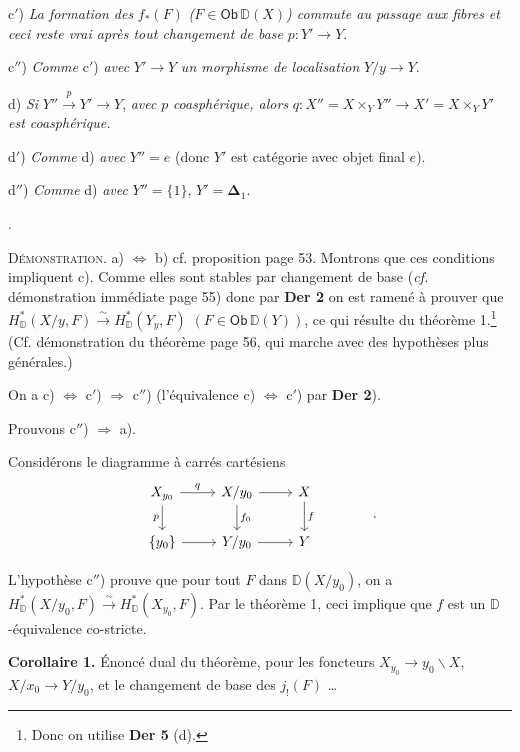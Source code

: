 \documentclass[11pt]{article}
\newcommand{\printedpage}[1]{\marginpar{\footnotesize p.~#1}}
\newcommand{\msp}[1]{\marginpar{\footnotesize [#1]}}
\newcommand{\D}{\mathbb{D}}
\newcommand{\Ob}{\mathsf{Ob}}
\begin{document}
c$'$) \textit{La formation des} $f_*(F)$ \textit{(}$F \in \Ob\, \D(X)$\textit{) commute au passage aux fibres et ceci reste vrai après tout changement de base} $p : Y' \to Y$.

c$''$) \textit{Comme} c$'$) \textit{avec} $Y' \to Y$ \textit{un morphisme de localisation} $Y/y \to Y$.

d) \textit{Si} $Y'' \overset{p}{\to} Y' \to Y$, \textit{avec} $p$ \textit{coasphérique, alors} $q : X'' = X \times_Y Y'' \to X' = X \times_Y Y'$ \textit{est coasphérique.}

\printedpage{41}

d$'$) \textit{Comme} d) \textit{avec} $Y'' = e$ (donc $Y'$ est catégorie avec objet final $e$).

d$''$) \textit{Comme} d) \textit{avec} $Y'' = \{1\}$, $Y' = \boldsymbol{\Delta}_1$.

.

\noindent\textsc{Démonstration}. a) $\Leftrightarrow$ b) cf. proposition page 53. Montrons que ces conditions impliquent c). Comme elles sont stables par changement de base (\textit{cf.} démonstration immédiate page 55) donc par \textbf{Der 2} on est ramené à prouver que $H^*_{\D}(X/y, F) \overset{\sim}{\to} H^*_{\D}(Y_y, F)$ $(F \in \Ob\, \D(Y))$, ce qui résulte du théorème 1.\footnote[30]{Donc on utilise \textbf{Der 5} (d).} (Cf. démonstration du théorème page 56, qui marche avec des hypothèses plus générales.)

On a c) $\Leftrightarrow$ c$'$) $\Rightarrow$ c$''$) (l'équivalence c) $\Leftrightarrow$ c$'$) par \textbf{Der 2}).

Prouvons c$''$) $\Rightarrow$ a).

\msp{page 70}

\noindent Considérons le diagramme à carrés cartésiens
\[
\begin{tikzcd}
X_{y_0} \arrow[r, "q"] \arrow[d, "p"{swap}] & X/y_0 \arrow[r] \arrow[d, "f_0"] & X \arrow[d, "f"] \\
\{y_0\} \arrow[r] & Y/y_0 \arrow[r] & Y
\end{tikzcd}
\qquad\qquad .
\]

\noindent L'hypothèse c$''$) prouve que pour tout $F$ dans $\D(X/y_0)$, on a $H^*_{\D}(X/y_0, F) \overset{\sim}{\to} H^*_{\D}(X_{y_0}, F)$. Par le théorème 1, ceci implique que $f$ est un $\D$-équivalence co-stricte. %

\noindent\textbf{Corollaire 1.} Énoncé dual du théorème, pour les foncteurs $X_{y_0} \to y_0\backslash X$, $X/x_0 \to Y/y_0$, et le changement de base des $j_!(F)$ \ldots
\end{document}
